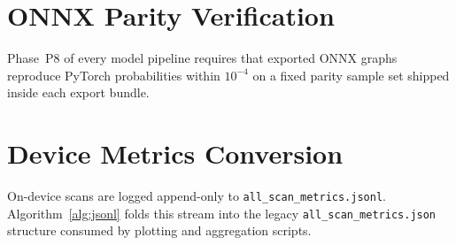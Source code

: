 \begin{algorithm}
  \caption{Cascade tier exit decision}
  \label{alg:cascade}
  \begin{algorithmic}
    
  \end{algorithmic}
\end{algorithm}

\section{ONNX Parity Verification}
Phase~P8 of every model pipeline requires that exported ONNX graphs reproduce PyTorch probabilities within $10^{-4}$ on a fixed parity sample set shipped inside each export bundle.

\begin{algorithm}
  \caption{PyTorch--ONNX parity gate (P8)}
  \label{alg:parity}
  \begin{algorithmic}
    
  \end{algorithmic}
\end{algorithm}

\section{Device Metrics Conversion}
On-device scans are logged append-only to \texttt{all\_scan\_metrics.jsonl}. Algorithm~\ref{alg:jsonl} folds this stream into the legacy \texttt{all\_scan\_metrics.json} structure consumed by plotting and aggregation scripts.

\begin{algorithm}
  \caption{JSONL-to-JSON metrics consolidation}
  \label{alg:jsonl}
  \begin{algorithmic}
    
  \end{algorithmic}
\end{algorithm}

\endinput
